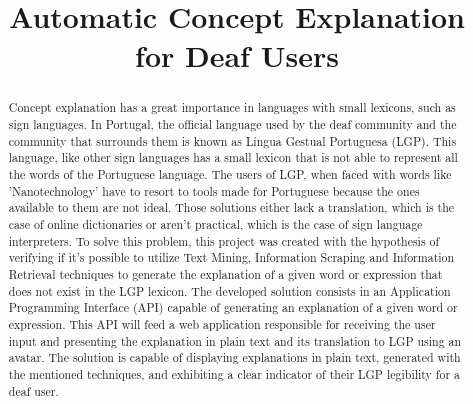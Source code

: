 \documentclass[runningheads]{llncs}
\begin{document}
%
\title{Automatic Concept Explanation for Deaf Users}
%
%
%
%
%
\maketitle              %
%
\begin{abstract}
    Concept explanation has a great importance in languages with small lexicons, such as sign languages.
    In Portugal, the official language used by the deaf community and the community that surrounds them is known as Língua Gestual Portuguesa (LGP).
    This language, like other sign languages has a small lexicon that is not able to represent all the words of the Portuguese language.
    The users of LGP, when faced with words like 'Nanotechnology' have to resort to tools made for Portuguese because the ones available to them are not ideal.
    Those solutions either lack a translation, which is the case of online dictionaries or aren't practical, which is the case of sign language interpreters.
    To solve this problem, this project was created with the hypothesis of verifying if it's possible to utilize Text Mining, Information Scraping and Information Retrieval techniques to generate the explanation of a given word or expression that does not exist in the LGP lexicon.
    The developed solution consists in an Application Programming Interface (API) capable of generating an explanation of a given word or expression.
    This API will feed a web application responsible for receiving the user input and presenting the explanation in plain text and its translation to LGP using an avatar.
    The solution is capable of displaying explanations in plain text, generated with the mentioned techniques, and exhibiting a clear indicator of their LGP legibility for a deaf user.

\end{abstract}
%
%
%
\end{document}
